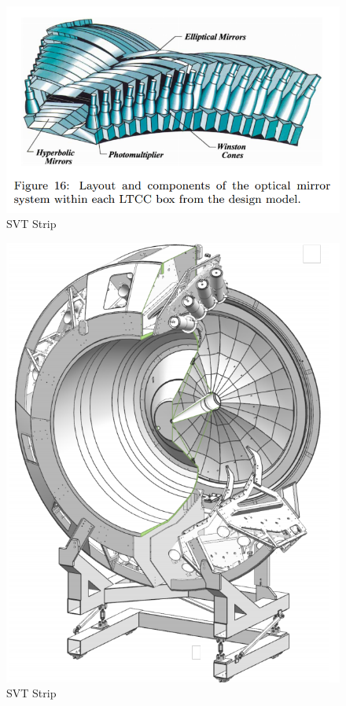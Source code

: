             									
			 \begin{figure}[H]
    			\centering
    			\includegraphics[width=12cm]{CLAS-12/modules/clas-12-system/pics/fd/htcc-mirrors.PNG}
    			\caption{SVT Strip}
			\end{figure}
			
						
									
			 \begin{figure}[H]
    			\centering
    			\includegraphics[width=12cm]{CLAS-12/modules/clas-12-system/pics/fd/htcc.PNG}
    			\caption{SVT Strip}
			\end{figure}
			

